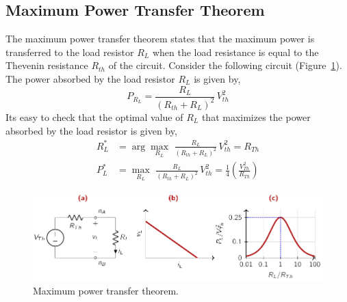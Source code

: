 \subsection{Maximum Power Transfer Theorem}
The maximum power transfer theorem states that the maximum power is transferred to the load resistor $R_L$ when the load resistance is equal to the Thevenin resistance $R_{th}$ of the circuit. Consider the following circuit (Figure~\ref{fig:02-06}). The power absorbed by the load resistor $R_L$ is given by,
\begin{equation}
    P_{R_L} = \frac{R_L}{(R_{th} + R_L)^2} \, V_{th}^2
    \label{eq:02-24}
\end{equation}
Its easy to check that the optimal value of $R_L$ that maximizes the power absorbed by the load resistor is given by,
\begin{equation}
    \begin{split}
        R_L^* &= \arg\max_{R_L} \,\, \frac{R_L}{(R_{th} + R_L)^2} \, V_{th}^2 = R_{Th} \\
        P_L^* &= \max_{R_L} \,\, \frac{R_L}{(R_{th} + R_L)^2} \, V_{th}^2 = \frac{1}{4}\left(\frac{V_{Th}^2}{R_{Th}}\right)
    \end{split}
    \label{eq:02-25}
\end{equation}

\begin{figure}[t]
    \centering
    \includegraphics[width=\textwidth]{figure/fig02-06.pdf}
    \caption{Maximum power transfer theorem.}
    \label{fig:02-06}
\end{figure}


